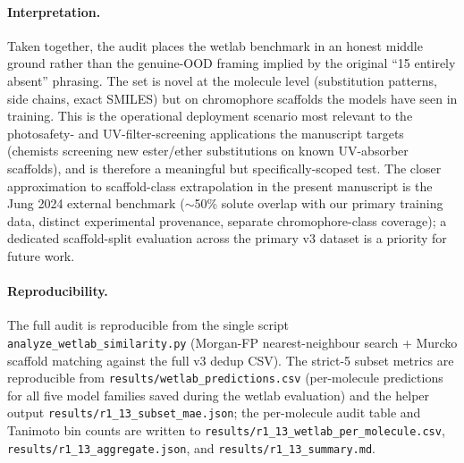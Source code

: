 \documentclass[journal=jcisd8,manuscript=suppinfo]{achemso}
\begin{document}
\paragraph{Interpretation.}
Taken together, the audit places the wetlab benchmark in an honest middle ground rather than the genuine-OOD framing implied by the original ``15 entirely absent'' phrasing. The set is novel at the molecule level (substitution patterns, side chains, exact SMILES) but on chromophore scaffolds the models have seen in training. This is the operational deployment scenario most relevant to the photosafety- and UV-filter-screening applications the manuscript targets (chemists screening new ester/ether substitutions on known UV-absorber scaffolds), and is therefore a meaningful but specifically-scoped test. The closer approximation to scaffold-class extrapolation in the present manuscript is the Jung 2024 external benchmark ($\sim$50\% solute overlap with our primary training data, distinct experimental provenance, separate chromophore-class coverage); a dedicated scaffold-split evaluation across the primary v3 dataset is a priority for future work.

\paragraph{Reproducibility.}
The full audit is reproducible from the single script \texttt{analyze\_wetlab\_similarity.py} (Morgan-FP nearest-neighbour search + Murcko scaffold matching against the full v3 dedup CSV). The strict-5 subset metrics are reproducible from \texttt{results/wetlab\_predictions.csv} (per-molecule predictions for all five model families saved during the wetlab evaluation) and the helper output \texttt{results/r1\_13\_subset\_mae.json}; the per-molecule audit table and Tanimoto bin counts are written to \texttt{results/r1\_13\_wetlab\_per\_molecule.csv}, \texttt{results/r1\_13\_aggregate.json}, and \texttt{results/r1\_13\_summary.md}.
\end{document}

